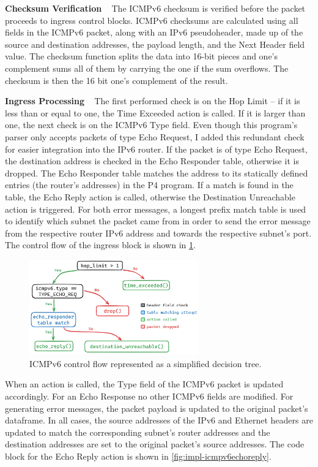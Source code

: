 \textbf{Checksum Verification} ~ The ICMPv6 checksum is verified before the packet proceeds to ingress control blocks. ICMPv6 checksums are calculated using all fields in the ICMPv6 packet, along with an IPv6 pseudoheader, made up of the source and destination addresses, the payload length, and the Next Header field value. The checksum function splits the data into 16-bit pieces and one's complement sums all of them by carrying the one if the sum overflows. The checksum is then the 16 bit one's complement of the result.

\textbf{Ingress Processing} ~ The first performed check is on the Hop Limit -- if it is less than or equal to one, the Time Exceeded action is called. If it is larger than one, the next check is on the ICMPv6 Type field. Even though this program's parser only accepts packets of type Echo Request, I added this redundant check for easier integration into the IPv6 router. If the packet is of type Echo Request, the destination address is checked in the Echo Responder table, otherwise it is dropped. The Echo Responder table matches the address to its statically defined entries (the router’s addresses) in the P4 program. If a match is found in the table, the Echo Reply action is called, otherwise the Destination Unreachable action is triggered. For both error messages, a longest prefix match table is used to identify which subnet the packet came from in order to send the error message from the respective router IPv6 address and towards the respective subnet’s port. The control flow of the ingress block is shown in \cref{fig:impl-icmpv6apply}.

\begin{figure}[htbp]
  \centering
    \includegraphics[width=0.65\textwidth]{figures/implementation/icmpv6_apply.jpg}
     \caption{ICMPv6 control flow represented as a simplified decision tree.}
     \label{fig:impl-icmpv6apply}
\end{figure}

When an action is called, the Type field of the ICMPv6 packet is updated accordingly. For an Echo Response no other ICMPv6 fields are modified. For generating error messages, the packet payload is updated to the original packet's dataframe. In all cases, the source addresses of the IPv6 and Ethernet headers are updated to match the corresponding subnet’s router addresses and the destination addresses are set to the original packet’s source addresses. The code block for the Echo Reply action is shown in \cref{fig:impl-icmpv6echoreply}.

